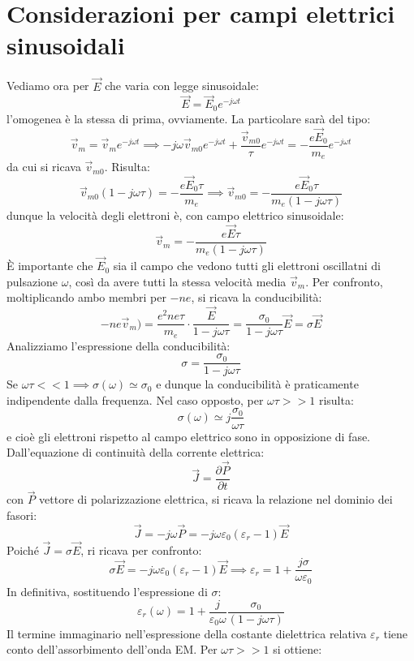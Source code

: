 \documentclass{book}
\begin{document}
    \section{Considerazioni per campi elettrici sinusoidali}
        Vediamo ora per $\vec{E}$ che varia con legge sinusoidale:
        $$\vec{E} = \vec{E}_{0}e^{-j \omega t}$$
        l'omogenea è la stessa di prima, ovviamente. La particolare sarà del tipo:
        $$\vec{v}_{m} = \vec{v}_{m} e^{-j \omega t} \implies -j \omega \vec{v}_{m0}e^{-j \omega t} + \frac{\vec{v}_{m0}}{\tau} e^{-j \omega t} = - \frac{e \vec{E}_{0}}{m_{e}}e^{-j \omega t}$$
        da cui si ricava $\vec{v}_{m0}$. Risulta:
        $$\vec{v}_{m0}(1-j \omega \tau) = - \frac{e \vec{E}_{0} \tau}{m_{e}} \implies \vec{v}_{m0} = - \frac{e \vec{E}_{0} \tau}{m_{e}(1- j \omega \tau)}$$
        dunque la velocità degli elettroni è, con campo elettrico sinusoidale:
        $$\vec{v}_{m} = -\frac{e \vec{E} \tau}{m_{e}(1- j \omega \tau)}$$
        È importante che $\vec{E}_{0}$ sia il campo che vedono tutti gli elettroni oscillatni di pulsazione $\omega$, così da avere tutti la stessa velocità media $\vec{v}_{m}$. Per confronto, moltiplicando ambo membri per $-ne$, si ricava la conducibilità:
        $$-ne\vec{v}_{m} ) = \frac{e^{2}ne \tau}{m_{e}} \cdot \frac{\vec{E}}{1- j\omega \tau} = \frac{\sigma_{0}}{1 - j \omega \tau}\vec{E} = \sigma \vec{E}$$
        Analizziamo l'espressione della conducibilità:
        $$\sigma = \frac{\sigma_{0}}{1 - j \omega \tau}$$
        Se $\omega \tau << 1 \implies \sigma(\omega) \simeq \sigma_{0}$ e dunque la conducibilità è praticamente indipendente dalla frequenza. Nel caso opposto, per $\omega \tau >>1$ risulta:
        $$\sigma(\omega) \simeq j \frac{\sigma_{0}}{\omega \tau}$$
        e cioè gli elettroni rispetto al campo elettrico sono in opposizione di fase.
        Dall'equazione di continuità della corrente elettrica:
        $$\vec{J} = \frac{\partial \vec{P}}{\partial t}$$
        con $\vec{P}$ vettore di polarizzazione elettrica, si ricava la relazione nel dominio dei fasori:
    $$\vec{J} = - j \omega \vec{P} = - j \omega \varepsilon_{0} ( \varepsilon_{r} - 1) \vec{E}$$
    Poiché $\vec{J} = \sigma \vec{E}$, ri ricava per confronto:
    $$\sigma \vec{E} = - j \omega \varepsilon_{0}(\varepsilon_{r}-1)\vec{E} \implies \varepsilon_{r} = 1 + \frac{j \sigma}{\omega \varepsilon_{0}}$$
    In definitiva, sostituendo l'espressione di $\sigma$:
    $$\varepsilon_{r}(\omega) = 1 + \frac{j}{\varepsilon_{0} \omega} \frac{\sigma_{0}}{(1- j \omega \tau)}$$
    Il termine immaginario nell'espressione della costante dielettrica relativa $\varepsilon_{r}$ tiene conto dell'assorbimento dell'onda EM. Per $\omega \tau >> 1$ si ottiene:
\end{document}
